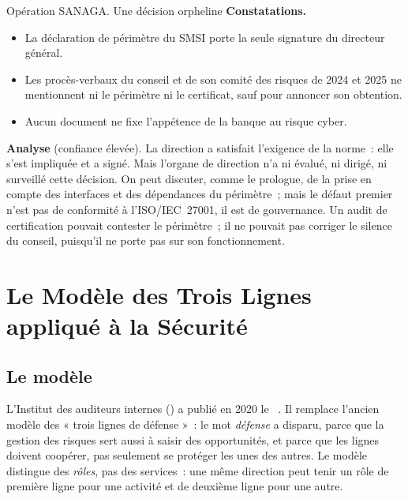 \begin{boxscenario}{Opération SANAGA. Une décision orpheline}
\textbf{Constatations.}
\begin{itemize}
    \item La déclaration de périmètre du SMSI porte la seule signature du
          directeur général.
    \item Les procès-verbaux du conseil et de son comité des risques de 2024
          et 2025 ne mentionnent ni le périmètre ni le certificat, sauf pour
          annoncer son obtention.
    \item Aucun document ne fixe l'appétence de la banque au risque cyber.
\end{itemize}

\textbf{Analyse} (confiance élevée). La direction a satisfait l'exigence
de la norme~: elle s'est impliquée et a signé. Mais l'organe de direction
n'a ni évalué, ni dirigé, ni surveillé cette décision. On peut discuter,
comme le prologue, de la prise en compte des interfaces et des dépendances
du périmètre~; mais le défaut premier n'est pas de conformité à
l'ISO/IEC~27001, il est de gouvernance. Un audit de certification pouvait
contester le périmètre~; il ne pouvait pas corriger le silence du conseil,
puisqu'il ne porte pas sur son fonctionnement.
\end{boxscenario}

\section{Le Modèle des Trois Lignes appliqué à la Sécurité}
\label{sec:c01-trois-lignes}

\subsection{Le modèle}

L'Institut des auditeurs internes () a publié en 2020 le
~\cite{iia2020troislignes}. Il remplace l'ancien modèle des
« trois lignes de défense »~: le mot \emph{défense} a disparu, parce que
la gestion des risques sert aussi à saisir des opportunités, et parce que
les lignes doivent coopérer, pas seulement se protéger les unes des autres.
Le modèle distingue des \emph{rôles}, pas des services~: une même
direction peut tenir un rôle de première ligne pour une activité et de
deuxième ligne pour une autre.

